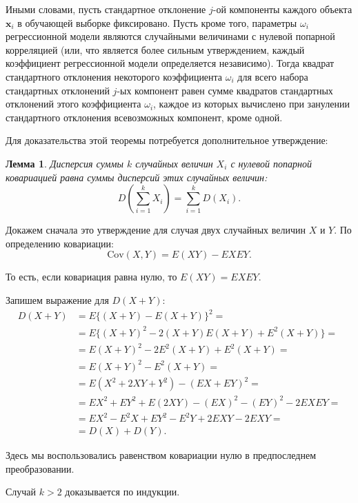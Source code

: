 \documentclass[12pt,a4paper]{article}
\newtheorem{lemm}{Лемма}
\begin{document}
Иными словами, пусть стандартное отклонение $j$-ой компоненты каждого
объекта $\mathbf{x}_i$ в обучающей выборке фиксировано. Пусть кроме того,
параметры $\omega_i$ регрессионной модели являются случайными величинами
с нулевой попарной корреляцией (или, что является более сильным утверждением,
каждый коэффициент регрессионной модели определяется независимо). Тогда квадрат
стандартного отклонения некоторого коэффициента $\omega_i$ для всего
набора стандартных отклонений $j$-ых компонент равен сумме квадратов
стандартных отклонений этого коэффициента $\omega_i$, каждое из которых
вычислено при занулении стандартного отклонения всевозможных компонент,
кроме одной.

Для доказательства этой теоремы потребуется дополнительное утверждение:
\begin{lemm}
  Дисперсия суммы $k$ случайных величин $X_i$ с нулевой попарной ковариацией равна
  суммы дисперсий этих случайных величин:
  \[
    D(\sum_{i=1}^k X_i) = \sum_{i=1}^k D(X_i).
  \]
  \label{lemma:sum_variance}
\end{lemm}
\begin{Proof}
  Докажем сначала это утверждение для случая двух случайных величин $X$
  и $Y$.
  По определению ковариации:
  \[
    \text{Cov}(X, Y) = E(XY) - EX EY.
  \]

  То есть, если ковариация равна нулю, то $E(XY) = EX EY$.
  
  Запишем выражение для $D(X + Y)$:
  \begin{align*}
    D(X+Y) &= E\{ (X + Y) - E(X + Y) \}^2 = \\
           &= E\{ (X + Y)^2 - 2 (X + Y) E (X + Y) + E^2 (X + Y) \} = \\
           &= E (X + Y)^2 - 2 E^2 (X + Y) + E^2 (X + Y) = \\
           &= E (X + Y)^2 - E^2 (X + Y) = \\
           &= E (X^2 + 2XY + Y^2) - (EX + EY)^2 = \\
           &= E X^2 + E Y^2 + E (2XY) - (EX)^2 - (EY)^2 - 2 EX EY = \\
           &= E X^2 - E^2 X + E Y^2 - E^2 Y + 2 EXY - 2 EXY = \\
           &= D(X) + D(Y).
  \end{align*}
  
  Здесь мы воспользовались равенством ковариации нулю в предпоследнем
  преобразовании.
  
  Случай $k > 2$ доказывается по индукции.
\end{Proof}
\end{document}
